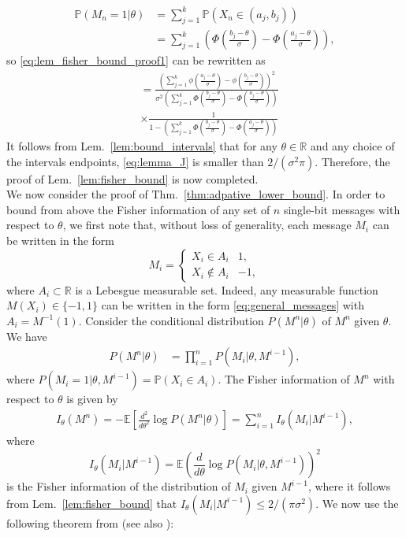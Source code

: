 \documentclass[letterpaper, conference]{IEEEtran}      %
\begin{document}
\begin{align*}
\mathbb P(M_n=1| \theta) & = \sum_{j=1}^k \mathbb P\left(X_n \in (a_j,b_j) \right)  \\
& = \sum_{j=1}^k \left( \Phi \left(\frac{b_j-\theta}{\sigma} \right) -  \Phi \left(\frac{a_j-\theta}{\sigma} \right)  \right),
\end{align*}
so \eqref{eq:lem_fisher_bound_proof1} can be rewritten as
\begin{align}
& =   \frac { \left( \sum_{j=1}^{k} \phi \left(\frac{a_j-\theta}{\sigma} \right) - \phi \left( \frac{b_j-\theta} {\sigma} \right)  \right)^2 } 
{\sigma^2 \left( \sum_{j=1}^k \Phi \left( \frac{b_j-\theta }{\sigma}\right) - \Phi \left( \frac{a_j-\theta }{\sigma}\right)  \right) }  \nonumber \\
& \times \frac {1} 
{1- \left( \sum_{j=1}^k \Phi \left( \frac{b_j-\theta }{\sigma}\right) - \Phi \left( \frac{a_j-\theta }{\sigma}\right)  \right) } 
\label{eq:lemma_J}
\end{align}
It follows from Lem.~\ref{lem:bound_intervals} that for any $\theta \in \mathbb R$ and any choice of the intervals endpoints, \eqref{eq:lemma_J} is smaller than $2/(\sigma^2 \pi)$. Therefore, the proof of  Lem.~\ref{lem:fisher_bound} is now completed.
 \\

We now consider the proof of Thm.~\ref{thm:adpative_lower_bound}. In order to bound from above the Fisher information of any set of $n$ single-bit messages with respect to $\theta$, we first note that, without loss of generality, each message $M_i$ can be written in the form
\begin{equation}
\label{eq:general_messages}
M_i = \begin{cases}
X_i \in A_i & 1, \\
X_i \notin A_i & -1,
\end{cases} 
\end{equation}
where $A_i \subset \mathbb R$ is a Lebesgue measurable set. Indeed, any measurable function $M(X_i) \in \{-1,1\}$ can be written in the form \eqref{eq:general_messages} with $A_i = M^{-1}(1)$. Consider the conditional distribution $P({M^n|\theta})$ of $M^n$ given $\theta$. We have 
\begin{align}
P\left( M^n | \theta \right) & =  \prod_{i=1}^n P\left(M_i | \theta, M^{i-1} \right), \label{eq:adpt_lower_bound_proof:1}
\end{align}
where $P\left(M_i =1 | \theta, M^{i-1}  \right) = \mathbb P\left( X_i \in A_i\right)$. The Fisher information of $M^n$ with respect to $\theta$ is given by 
\begin{align}
I_\theta(M^n) = -\mathbb E \left[ \frac{d^2}{d\theta^2} \log P(M^n | \theta) \right] = \sum_{i=1}^n I_\theta (M_i|M^{i-1}),
\label{eq:fisher_information}
\end{align}
where 
\[
I_\theta (M_i|M^{i-1}) = \mathbb E \left( \frac{d}{d\theta} \log P(M_i | \theta, M^{i-1}) \right)^2
\]
 is the Fisher information of the distribution of $M_i$ given $M^{i-1}$, where it follows from Lem.~\ref{lem:fisher_bound} that $I_\theta (M_i|M^{i-1}) \leq 2/(\pi \sigma^2)$. We now use the following theorem from \cite[Thm. 2.13]{tsybakov2008introduction} (see also \cite{van2004detection, gill1995applications}):
\end{document}
